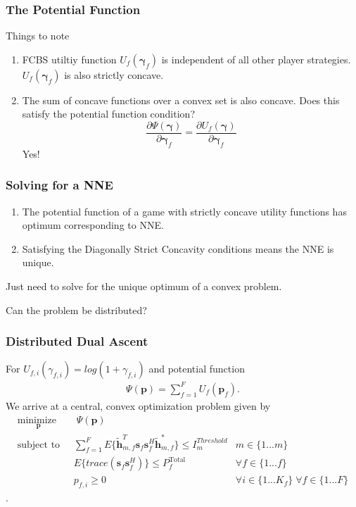 \documentclass[10pt,tgadventor, onlymath]{beamer}
\begin{document}
\begin{frame}
\frametitle{The Potential Function}
Things to note
\begin{enumerate}
\item
	FCBS utiltiy function $U_{f}(\boldsymbol{\gamma}_{f})$ is independent of all other player strategies. 
	$U_{f}(\boldsymbol{\gamma}_{f})$ is also strictly concave.
\item
	The sum of concave functions over a convex set is also concave. Does this satisfy the potential function 			condition?
	\begin{equation*}\label{potential_game_condition}
\frac{\partial \Psi(\boldsymbol{\gamma})}{\partial \boldsymbol{\gamma}_{f}}
 =
 \frac{\partial U_f(\boldsymbol{\gamma})}{\partial \boldsymbol{\gamma}_{f}}
\end{equation*} 
Yes!
\end{enumerate}

\end{frame}

\begin{frame}
\frametitle{Solving for a NNE}
\begin{enumerate}
\setlength\itemsep{2em}

\item
	The potential function of a game with strictly concave utility functions has optimum corresponding to NNE.
\item
	Satisfying the Diagonally Strict Concavity conditions means the NNE is unique.
\end{enumerate}
\bigskip
Just need to solve for the unique optimum of a convex problem.
\pause
\par
 Can the problem be distributed?
\end{frame}

\begin{frame}
\frametitle{Distributed Dual Ascent}
For $U_{f,i}(\gamma_{f,i}) = log(1+\gamma_{f,i})$ and potential function
\begin{gather*} \label{Potential_Function}
\Psi(\mathbf{p}) = \sum_{f = 1}^{F} U_{f}(\mathbf{p}_{f}).
\end{gather*}
We arrive at a central, convex optimization problem given by
		\begin{subequations}
	\label{optim}
	\begin{align}
	    \underset{\mathbf{p}}{\text{minimize  }}
	    & \; \Psi(\mathbf{p}) \label{potential_game} \\
	    \text{subject to  } \; &
	  \sum^F_{f=1} E\{\tilde{\mathbf{h}}_{m,f}^T  \mathbf{s}_{f} 						
	\mathbf{s}_{f}^{H} \tilde{\mathbf{h}}_{m,f}^* \}\leq I^{Threshold}		
	_{m} & m \in \{1 ...m\} 
		\label{interference_const}\\
        & E\{trace(\mathbf{s}_f\mathbf{s}_f^H)\}  \leq P_{f}^{\text{Total}}  \label{power_const}
        & \forall f \in \{1 ... f\}\\
        & p_{f,i} \geq 0 &  \forall i \in \{1 ...K_{f}\} \; \forall f \in \{1 ... F\}\label{pos_power_const}
	\end{align}
	\end{subequations}.
\end{frame}
\end{document}
